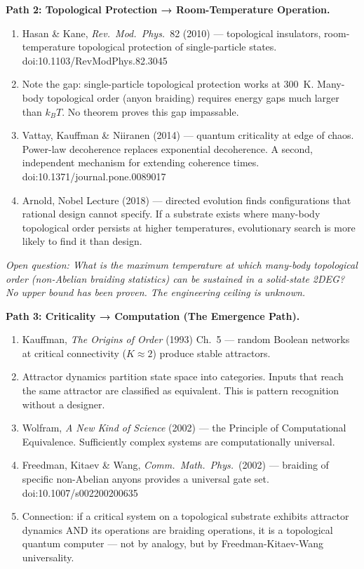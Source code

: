 \medskip

\noindent\textbf{Path 2: Topological Protection → Room-Temperature Operation.}

\begin{enumerate}
\item Hasan \& Kane, \textit{Rev.\ Mod.\ Phys.}\ 82 (2010) --- topological insulators, room-temperature topological protection of single-particle states. doi:10.1103/RevModPhys.82.3045
\item Note the gap: single-particle topological protection works at 300~K. Many-body topological order (anyon braiding) requires energy gaps much larger than $k_BT$. No theorem proves this gap impassable.
\item Vattay, Kauffman \& Niiranen (2014) --- quantum criticality at edge of chaos. Power-law decoherence replaces exponential decoherence. A second, independent mechanism for extending coherence times. doi:10.1371/journal.pone.0089017
\item Arnold, Nobel Lecture (2018) --- directed evolution finds configurations that rational design cannot specify. If a substrate exists where many-body topological order persists at higher temperatures, evolutionary search is more likely to find it than design.
\end{enumerate}

\noindent\textit{Open question: What is the maximum temperature at which many-body topological order (non-Abelian braiding statistics) can be sustained in a solid-state 2DEG? No upper bound has been proven. The engineering ceiling is unknown.}

\medskip

\noindent\textbf{Path 3: Criticality → Computation (The Emergence Path).}

\begin{enumerate}
\item Kauffman, \textit{The Origins of Order} (1993) Ch.~5 --- random Boolean networks at critical connectivity ($K \approx 2$) produce stable attractors.
\item Attractor dynamics partition state space into categories. Inputs that reach the same attractor are classified as equivalent. This is pattern recognition without a designer.
\item Wolfram, \textit{A New Kind of Science} (2002) --- the Principle of Computational Equivalence. Sufficiently complex systems are computationally universal.
\item Freedman, Kitaev \& Wang, \textit{Comm.\ Math.\ Phys.}\ (2002) --- braiding of specific non-Abelian anyons provides a universal gate set. doi:10.1007/s002200200635
\item Connection: if a critical system on a topological substrate exhibits attractor dynamics AND its operations are braiding operations, it is a topological quantum computer --- not by analogy, but by Freedman-Kitaev-Wang universality.
\end{enumerate}

